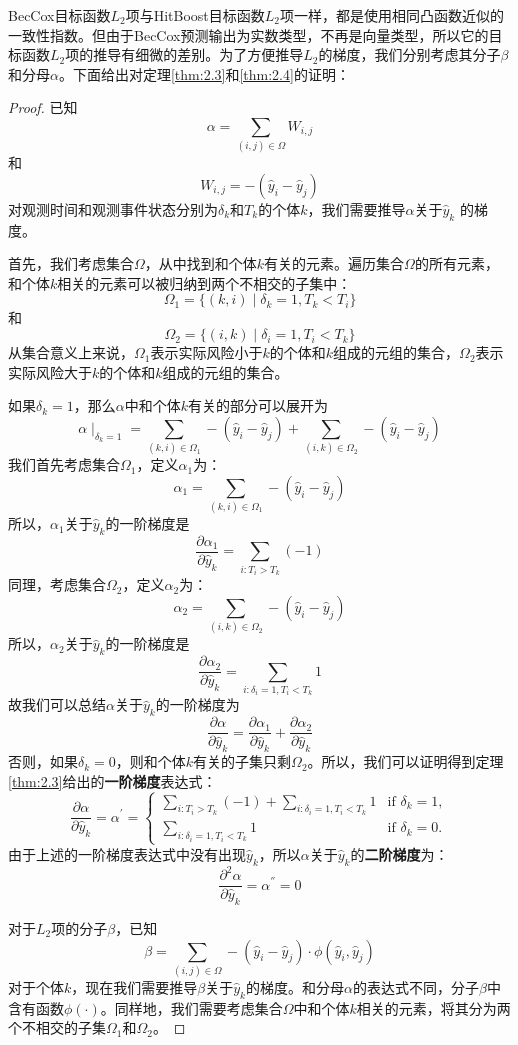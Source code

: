 BecCox目标函数$L_2$项与HitBoost目标函数$L_2$项一样，都是使用相同凸函数近似的一致性指数。但由于BecCox预测输出为实数类型，不再是向量类型，所以它的目标函数$L_2$项的推导有细微的差别。为了方便推导$L_2$的梯度，我们分别考虑其分子$\beta$和分母$\alpha$。下面给出对定理\ref{thm:2.3}和\ref{thm:2.4}的证明：
\begin{proof}
已知$$\alpha = \sum_{(i,j)\in \Omega} W_{i,j}$$ 和 $$W_{i,j}=-(\hat{y}_i-\hat{y}_j)$$对观测时间和观测事件状态分别为$\delta_k$和$T_k$的个体$k$，我们需要推导$\alpha$关于$\hat{y}_k$ 的梯度。

首先，我们考虑集合$\Omega$，从中找到和个体$k$有关的元素。遍历集合$\Omega$的所有元素，和个体$k$相关的元素可以被归纳到两个不相交的子集中：$$\Omega_1=\{(k,i) \mid \delta_k=1,T_k < T_i\}$$ 和 $$\Omega_2=\{(i,k) \mid \delta_i=1,T_i < T_k\}$$ 从集合意义上来说，$\Omega_1$表示实际风险小于$k$的个体和$k$组成的元组的集合，$\Omega_2$表示实际风险大于$k$的个体和$k$组成的元组的集合。

如果$\delta_k = 1$，那么$\alpha$中和个体$k$有关的部分可以展开为$$\alpha \mid_{\delta_k=1}=\sum_{(k,i)\in \Omega_1} -(\hat{y}_i-\hat{y}_j) + \sum_{(i,k)\in \Omega_2} -(\hat{y}_i-\hat{y}_j) $$ 我们首先考虑集合$\Omega_1$，定义$\alpha_1$为：$$\alpha_1 = \sum_{(k,i)\in \Omega_1} -(\hat{y}_i-\hat{y}_j)$$ 所以，$\alpha_1$关于$\hat{y}_k$的一阶梯度是$$\frac{\partial \alpha_1}{\partial \hat{y}_k} = \sum\limits_{i: T_i>T_k}(-1)$$ 同理，考虑集合$\Omega_2$，定义$\alpha_2$为：$$\alpha_2 = \sum_{(i,k)\in \Omega_2} -(\hat{y}_i-\hat{y}_j)$$ 所以，$\alpha_2$关于$\hat{y}_k$的一阶梯度是$$\frac{\partial \alpha_2}{\partial \hat{y}_k} = \sum\limits_{i: \delta_i=1,T_i<T_k} 1$$ 故我们可以总结$\alpha$关于$\hat{y}_k$的一阶梯度为$$\frac{\partial \alpha}{\partial \hat{y}_k} = \frac{\partial \alpha_1}{\partial \hat{y}_k} + \frac{\partial \alpha_2}{\partial \hat{y}_k}$$ 否则，如果$\delta_k = 0$，则和个体$k$有关的子集只剩$\Omega_2$。所以，我们可以证明得到定理\ref{thm:2.3}给出的\textbf{一阶梯度}表达式：$$
\frac{\partial \alpha}{\partial \hat{y}_k}=\alpha^{'}=
\begin{cases}
\sum\limits_{i: T_i>T_k}(-1) + \sum\limits_{i: \delta_i=1,T_i<T_k} 1 & \text{if } \delta_k = 1,\\
\sum\limits_{i: \delta_i=1,T_i<T_k} 1 & \text{if } \delta_k = 0.
\end{cases}
$$ 由于上述的一阶梯度表达式中没有出现$\hat{y}_k$，所以$\alpha$关于$\hat{y}_k$的\textbf{二阶梯度}为：$$
\frac{\partial^2 \alpha}{\partial \hat{y}_k}=\alpha^{''}=0
$$

对于$L_2$项的分子$\beta$，已知$$\beta = \sum_{(i,j)\in \Omega} -(\hat{y}_i-\hat{y}_j) \cdot \phi(\hat{y}_i, \hat{y}_j)$$ 对于个体$k$，现在我们需要推导$\beta$关于$\hat{y}_k$的梯度。和分母$\alpha$的表达式不同，分子$\beta$中含有函数$\phi(\cdot)$。同样地，我们需要考虑集合$\Omega$中和个体$k$相关的元素，将其分为两个不相交的子集$\Omega_1$和$\Omega_2$。


\end{proof}
